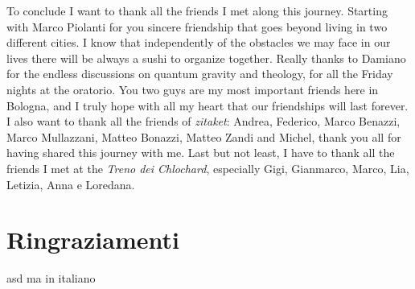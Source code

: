 To conclude I want to thank all the friends I met along this journey. Starting with Marco Piolanti for you sincere friendship that goes beyond living in two different cities. I know that independently of the obstacles we may face in our lives there will be always a sushi to organize together. Really thanks to Damiano for the endless discussions on quantum gravity and theology, for all the Friday nights at the oratorio. You two guys are my most important friends here in Bologna, and I truly hope with all my heart that our friendships will last forever. I also want to thank all the friends of \emph{zitaket}: Andrea, Federico, Marco Benazzi, Marco Mullazzani, Matteo Bonazzi, Matteo Zandi and Michel, thank you all for having shared this journey with me. Last but not least, I have to thank all the friends I met at the \emph{Treno dei Chlochard}, especially Gigi, Gianmarco, Marco, Lia, Letizia, Anna e Loredana. 

\newpage
\section*{Ringraziamenti}
asd ma in italiano